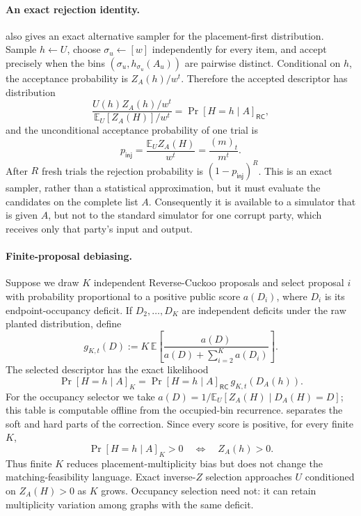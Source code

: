 \paragraph{An exact rejection identity.}
 also gives an exact alternative
sampler for the placement-first distribution.  Sample $h\gets U$, choose
$\sigma_u\gets[w]$ independently for every item, and accept precisely when
the bins $(\sigma_u,h_{\sigma_u}(A_u))$ are pairwise distinct.  Conditional on
$h$, the acceptance probability is $Z_A(h)/w^t$.  Therefore the accepted
descriptor has distribution
\[
 \frac{U(h)Z_A(h)/w^t}
      {\mathbb E_U[Z_A(H)]/w^t}
 = \Pr[H=h\mid A]_{\mathsf{RC}},
\]
and the unconditional acceptance probability of one trial is
\begin{equation}\label{eq:rev-cuckoo-rejection-probability}
 p_{\mathsf{inj}}=
 \frac{\mathbb E_U Z_A(H)}{w^t}
 =\frac{(m)_t}{m^t}.
\end{equation}
After $R$ fresh trials the rejection probability is
$(1-p_{\mathsf{inj}})^R$.  This is an exact sampler, rather than a statistical
approximation, but it must evaluate the candidates on the complete list $A$.
Consequently it is available to a simulator that is given $A$, but not to the
standard simulator for one corrupt party, which receives only that party's
input and output.

\paragraph{Finite-proposal debiasing.}
Suppose we draw $K$ independent Reverse-Cuckoo proposals and select proposal
$i$ with probability proportional to a positive public score $a(D_i)$, where
$D_i$ is its endpoint-occupancy deficit.  If $D_2,\ldots,D_K$ are independent
deficits under the raw planted distribution, define
\[
 g_{K,t}(D):=K\,\mathbb E\left[
   \frac{a(D)}{a(D)+\sum_{i=2}^K a(D_i)}
 \right].
\]
The selected descriptor has the exact likelihood
\begin{equation}\label{eq:rev-cuckoo-finite-k-channel}
 \Pr[H=h\mid A]_K
 =\Pr[H=h\mid A]_{\mathsf{RC}}\,g_{K,t}(D_A(h)).
\end{equation}
For the occupancy selector we take
$a(D)=1/\mathbb E_U[Z_A(H)\mid D_A(H)=D]$; this table is computable offline
from the occupied-bin recurrence.  
separates the soft and hard parts of the correction.  Since every score is
positive, for every finite $K$,
\[
 \Pr[H=h\mid A]_K>0\quad\Longleftrightarrow\quad Z_A(h)>0.
\]
Thus finite $K$ reduces placement-multiplicity bias but does not change the
matching-feasibility language.  Exact inverse-$Z$ selection approaches
$U$ conditioned on $Z_A(H)>0$ as $K$ grows.  Occupancy selection need not:
it can retain multiplicity variation among graphs with the same deficit.


